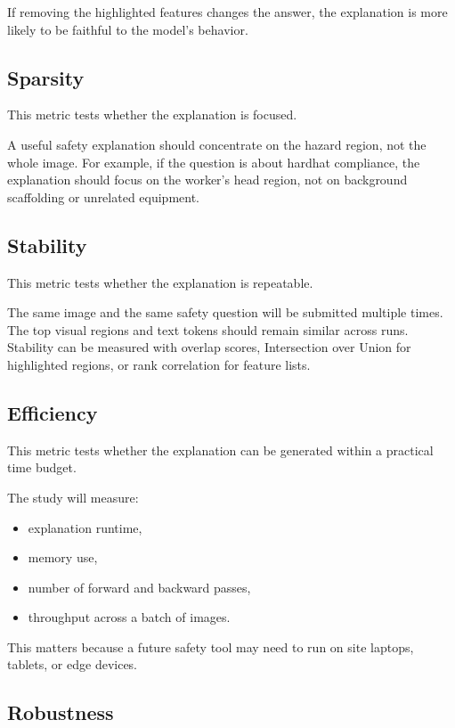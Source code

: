 \documentclass[11pt,letterpaper]{article}
\begin{document}
If removing the highlighted features changes the answer, the explanation is more likely to be faithful to the model's behavior.

\subsection{Sparsity}

This metric tests whether the explanation is focused.

A useful safety explanation should concentrate on the hazard region, not the whole image. For example, if the question is about hardhat compliance, the explanation should focus on the worker's head region, not on background scaffolding or unrelated equipment.

\subsection{Stability}

This metric tests whether the explanation is repeatable.

The same image and the same safety question will be submitted multiple times. The top visual regions and text tokens should remain similar across runs. Stability can be measured with overlap scores, Intersection over Union for highlighted regions, or rank correlation for feature lists.

\subsection{Efficiency}

This metric tests whether the explanation can be generated within a practical time budget.

The study will measure:

\begin{itemize}
  \item explanation runtime,
  \item memory use,
  \item number of forward and backward passes,
  \item throughput across a batch of images.
\end{itemize}

This matters because a future safety tool may need to run on site laptops, tablets, or edge devices.

\subsection{Robustness}
\end{document}

